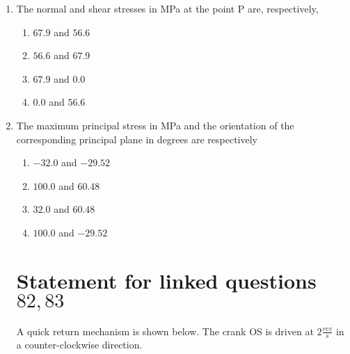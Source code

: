 \documentclass[journal,12pt,twocolumn]{IEEEtran}
\theoremstyle{remark}
\begin{document}
\begin{enumerate}[start=69]
                        \item The normal and shear stresses in MPa at the point P are, respectively,
                        \begin{enumerate}
                            \item $67.9$ and $56.6$
                            \item $56.6$ and $67.9$
                            \item $67.9$ and $0.0$
                            \item $0.0$ and $56.6$
                        \end{enumerate}
                        \item  The maximum principal stress in MPa and the orientation of the corresponding principal plane in degrees are respectively
                            \begin{enumerate}
                               \item  $-32.0$ and $-29.52 $
                               \item  $100.0$ and $60.48 $
                               \item  $32.0$ and $60.48$ 
                               \item  $100.0$ and $-29.52$
                            \end{enumerate}
                        \section{Statement for linked questions$82 , 83$}
			  A quick return mechanism is shown below. The crank OS is driven at $2 \frac{rev}{s}$ in a counter-clockwise direction.
\end{enumerate}
\end{document}
